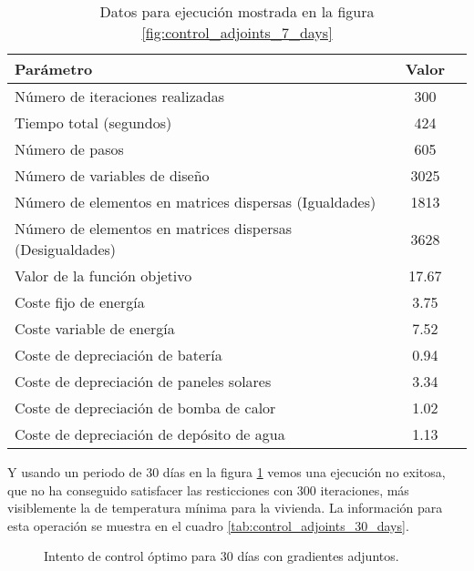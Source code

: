 \begin{table}[ht]
	\centering
	\caption{Datos para ejecución mostrada en la figura \ref{fig:control_adjoints_7_days}}
	\label{tab:control_adjoints_7_days}
	\begin{tabular}{@{}lcc@{}}
		\toprule
		Parámetro                                                 & Valor \\
		\midrule
		Número de iteraciones realizadas                          & 300   \\
		Tiempo total (segundos)                                   & 424   \\
		Número de pasos                                           & 605   \\
		Número de variables de diseño                             & 3025  \\
		Número de elementos en matrices dispersas (Igualdades)    & 1813  \\
		Número de elementos en matrices dispersas (Desigualdades) & 3628  \\
		\midrule
		Valor de la función objetivo                              & 17.67 \\
		\midrule
		Coste fijo de energía                                     & 3.75  \\
		Coste variable de energía                                 & 7.52  \\
		Coste de depreciación de batería                          & 0.94  \\
		Coste de depreciación de paneles solares                  & 3.34  \\
		Coste de depreciación de bomba de calor                   & 1.02  \\
		Coste de depreciación de depósito de agua                 & 1.13  \\
		\bottomrule
	\end{tabular}
\end{table}

Y usando un periodo de 30 días en la figura \ref{fig:control_adjoints_30_days}
vemos una ejecución no exitosa, que no ha conseguido satisfacer las
resticciones con 300 iteraciones, más visiblemente la de temperatura mínima
para la vivienda. La información para esta operación se muestra en el cuadro
\ref{tab:control_adjoints_30_days}.

\begin{figure}[h] \centering
	\centering
	
	\caption{Intento de control óptimo para 30 días con gradientes adjuntos.}
	\label{fig:control_adjoints_30_days}
\end{figure}

